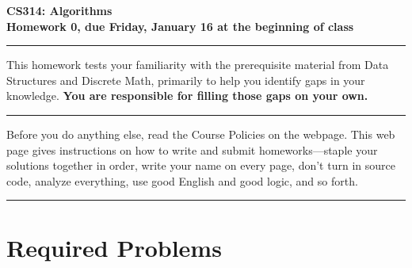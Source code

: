 \documentclass[11pt]{article}
\begin{document}


\begin{center}
{\LARGE\bf      CS314: Algorithms}
\\[1ex]
{\Large\bf      Homework 0, due Friday, January 16 at the beginning
of class}
\\[0.25in]
\end{center}

\bigskip\hrule\bigskip
\noindent This homework tests your familiarity with the prerequisite
material from Data Structures and Discrete Math, primarily to help
you identify gaps in your knowledge. \textbf{You are responsible for
   filling those gaps on your own.}

\bigskip\hrule\bigskip
\noindent Before you do anything else, read the Course Policies on
the webpage.  This web page gives instructions on how to write and
submit homeworks---staple your solutions together in order, write
your name on every page, don't turn in source code, analyze
everything, use good English and good logic, and so forth.

\medskip
\bigskip\hrule\bigskip

\section*{Required Problems}
\end{document}
